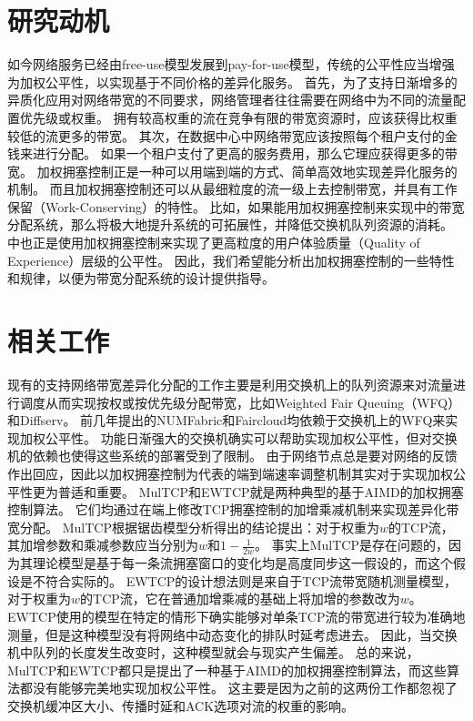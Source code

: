\documentclass[winfonts]{njuthesis}
\begin{document}
\section{研究动机}

如今网络服务已经由free-use模型发展到pay-for-use模型，传统的公平性应当增强为加权公平性，以实现基于不同价格的差异化服务。
首先，为了支持日渐增多的异质化应用对网络带宽的不同要求，网络管理者往往需要在网络中为不同的流量配置优先级或权重\cite{Hong2013SWAN}。
拥有较高权重的流在竞争有限的带宽资源时，应该获得比权重较低的流更多的带宽。
其次，在数据中心中网络带宽应该按照每个租户支付的金钱来进行分配\cite{popa2012faircloud}。
如果一个租户支付了更高的服务费用，那么它理应获得更多的带宽。
加权拥塞控制正是一种可以用端到端的方式、简单高效地实现差异化服务的机制。
而且加权拥塞控制还可以从最细粒度的流一级上去控制带宽，并具有工作保留（Work-Conserving）的特性。
比如，如果能用加权拥塞控制来实现\cite{popa2012faircloud}中的带宽分配系统，那么将极大地提升系统的可拓展性，并降低交换机队列资源的消耗。
\cite{Nathan2019wcubic}中也正是使用加权拥塞控制来实现了更高粒度的用户体验质量（Quality of Experience）层级的公平性。
因此，我们希望能分析出加权拥塞控制的一些特性和规律，以便为带宽分配系统的设计提供指导。

\section{相关工作}

现有的支持网络带宽差异化分配的工作主要是利用交换机上的队列资源来对流量进行调度从而实现按权或按优先级分配带宽，比如Weighted Fair Queuing（WFQ）\cite{demers1989analysis}\cite{Abhay1993WFQ}和Diffserv\cite{Kathleen1998Diffserv}。
前几年提出的NUMFabric\cite{nagaraj2016numfabric}和Faircloud\cite{popa2012faircloud}均依赖于交换机上的WFQ来实现加权公平性。
功能日渐强大的交换机确实可以帮助实现加权公平性，但对交换机的依赖也使得这些系统的部署受到了限制。
由于网络节点总是要对网络的反馈作出回应，因此以加权拥塞控制为代表的端到端速率调整机制其实对于实现加权公平性更为普适和重要。
MulTCP\cite{crowcroft1998differentiated}和EWTCP\cite{wischik2011design}就是两种典型的基于AIMD的加权拥塞控制算法。
它们均通过在端上修改TCP拥塞控制的加增乘减机制来实现差异化带宽分配。
MulTCP根据锯齿模型分析得出的结论\cite{Floyd1997Sawtooth}提出：对于权重为$w$的TCP流，其加增参数和乘减参数应当分别为$w$和$1-\frac{1}{2w}$。
事实上MulTCP是存在问题的，因为其理论模型是基于每一条流拥塞窗口的变化均是高度同步这一假设的，而这个假设是不符合实际的。
EWTCP的设计想法则是来自于TCP流带宽随机测量模型\cite{padhye1998modeling}，对于权重为$w$的TCP流，它在普通加增乘减的基础上将加增的参数改为$w$。
EWTCP使用的模型在特定的情形下确实能够对单条TCP流的带宽进行较为准确地测量，但是这种模型没有将网络中动态变化的排队时延考虑进去。
因此，当交换机中队列的长度发生改变时，这种模型就会与现实产生偏差。
总的来说，MulTCP和EWTCP都只是提出了一种基于AIMD的加权拥塞控制算法，而这些算法都没有能够完美地实现加权公平性。
这主要是因为之前的这两份工作\cite{crowcroft1998differentiated}\cite{wischik2011design}都忽视了交换机缓冲区大小、传播时延和ACK选项对流的权重的影响。
\end{document}
